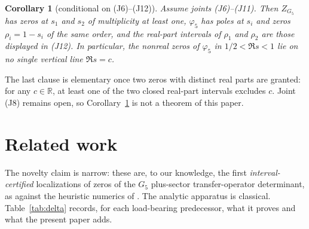 \documentclass[11pt]{amsart}
\newtheorem{corollary}[theorem]{Corollary}
\theoremstyle{definition}
\theoremstyle{remark}
\newcommand{\phif}{\varphi_5}
\newcommand{\Zf}{Z_{G_5}}
\begin{document}
\begin{corollary}[conditional on \textup{(J6)}--\textup{(J12)}]
\label{cor:scattering}
Assume joints \textup{(J6)}--\textup{(J11)}. Then $\Zf$ has zeros
at $s_1$ and $s_2$ of multiplicity at least one, $\phif$ has poles
at $s_i$ and zeros $\rho_i=1-s_i$ of the same order, and the
real-part intervals of $\rho_1$ and $\rho_2$ are those displayed in
\textup{(J12)}. In particular, the nonreal zeros of $\phif$ in
$1/2<\Re s<1$ lie on no single vertical line $\Re s=c$.
\end{corollary}

The last clause is elementary once two zeros with distinct real
parts are granted: for any $c\in\mathbb R$, at least one of the two
closed real-part intervals excludes $c$. Joint (J8) remains open,
so Corollary~\ref{cor:scattering} is not a theorem of this paper.

\section{Related work}
\label{sec:related}

The novelty claim is narrow: these are, to our knowledge, the first
\emph{interval-certified} localizations of zeros of the $G_5$
plus-sector transfer-operator determinant, as against the heuristic
numerics of \cite{Stromberg2009}. The analytic apparatus is
classical. Table~\ref{tab:delta} records, for each load-bearing
predecessor, what it proves and what the present paper adds.
\end{document}
